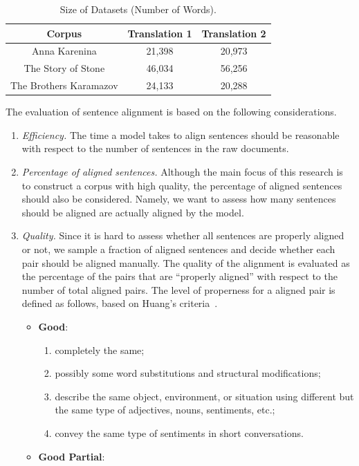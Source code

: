 \documentclass[runningheads]{llncs}
\begin{document}
\begin{spacing}{1.1}
\begin{table}[h!]\footnotesize
	\centering
	\small
	\begin{tabular}{|c|c|c|}
		\hline
		Corpus & Translation 1 & Translation 2 \\
		\hline
		Anna Karenina & 21,398 & 20,973 \\
		The Story of Stone & 46,034 & 56,256 \\
		The Brothers Karamazov & 24,133 & 20,288 \\
		\hline
	\end{tabular}
	\caption{Size of Datasets (Number of Words).}\label{tb:1}
\end{table}

The evaluation of sentence alignment is based on the following considerations.
\begin{enumerate}
	\item \emph{Efficiency.} The time a model takes to align sentences should be reasonable with respect to the number of sentences in the raw documents.
	\item \emph{Percentage of aligned sentences.} Although the main focus of this research is to construct a corpus with high quality, the percentage of aligned sentences should also be considered. Namely, we want to assess how many sentences should be aligned are actually aligned by the model.
	\item \emph{Quality.} Since it is hard to assess whether all sentences are properly aligned or not, we sample a fraction of aligned sentences and decide whether each pair should be aligned manually. The quality of the alignment is evaluated as the percentage of the pairs that are ``properly aligned'' with respect to the number of total aligned pairs. The level of properness for a aligned pair is defined as follows, based on Huang's criteria~\cite{hwang2015aligning}.
	\begin{itemize}
		\item \textbf{Good}:
		\begin{enumerate}
			\item completely the same;
			\item possibly some word substitutions and structural modifications;
			\item describe the same object, environment, or situation using different but the same type of adjectives, nouns, sentiments, etc.;
			\item convey the same type of sentiments in short conversations.
		\end{enumerate}
		\item \textbf{Good Partial}:

\end{itemize}
\end{enumerate}
\end{spacing}
\end{document}
